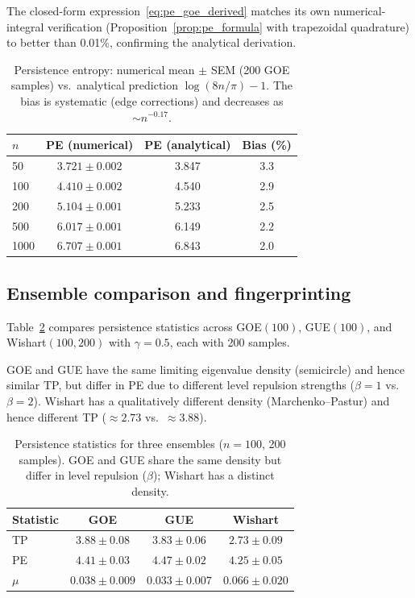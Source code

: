 \documentclass[aps,pre,twocolumn,superscriptaddress,showpacs]{revtex4-2}
\begin{document}
The closed-form expression~\eqref{eq:pe_goe_derived} matches its own numerical-integral verification (Proposition~\ref{prop:pe_formula} with trapezoidal quadrature) to better than 0.01\%, confirming the analytical derivation.

\begin{table}[h]
\caption{Persistence entropy: numerical mean $\pm$ SEM (200 GOE samples) vs.\ analytical prediction $\log(8n/\pi) - 1$. The bias is systematic (edge corrections) and decreases as $\sim n^{-0.17}$.}
\label{tab:formula}
\begin{ruledtabular}
\begin{tabular}{lccc}
$n$ & PE (numerical) & PE (analytical) & Bias (\%) \\
\midrule
50 & $3.721 \pm 0.002$ & 3.847 & 3.3 \\
100 & $4.410 \pm 0.002$ & 4.540 & 2.9 \\
200 & $5.104 \pm 0.001$ & 5.233 & 2.5 \\
500 & $6.017 \pm 0.001$ & 6.149 & 2.2 \\
1000 & $6.707 \pm 0.001$ & 6.843 & 2.0 \\
\end{tabular}
\end{ruledtabular}
\end{table}

\subsection{Ensemble comparison and fingerprinting}

Table~\ref{tab:ensembles} compares persistence statistics across GOE$(100)$, GUE$(100)$, and Wishart$(100, 200)$ with $\gamma = 0.5$, each with 200 samples.

GOE and GUE have the same limiting eigenvalue density (semicircle) and hence similar TP, but differ in PE due to different level repulsion strengths ($\beta = 1$ vs.\ $\beta = 2$). Wishart has a qualitatively different density (Marchenko--Pastur) and hence different TP ($\approx 2.73$ vs.\ $\approx 3.88$).

\begin{table}[h]
\caption{Persistence statistics for three ensembles ($n = 100$, 200 samples). GOE and GUE share the same density but differ in level repulsion ($\beta$); Wishart has a distinct density.}
\label{tab:ensembles}
\begin{ruledtabular}
\begin{tabular}{lccc}
Statistic & GOE & GUE & Wishart \\
\midrule
TP & $3.88 \pm 0.08$ & $3.83 \pm 0.06$ & $2.73 \pm 0.09$ \\
PE & $4.41 \pm 0.03$ & $4.47 \pm 0.02$ & $4.25 \pm 0.05$ \\
$\mu$ & $0.038 \pm 0.009$ & $0.033 \pm 0.007$ & $0.066 \pm 0.020$ \\
\end{tabular}
\end{ruledtabular}
\end{table}
\end{document}
